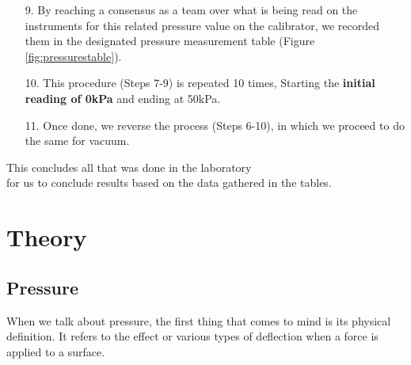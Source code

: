 \documentclass{article}
\begin{document}
	\begin{minipage}{0.51\textwidth}\vspace{-2em}\raggedright
		\begin{enumerate}[left=0in]
			\item[9.]  By reaching a consensus as a team over what is being read on the instruments for this related pressure value on the calibrator, we recorded them in the designated pressure measurement table (Figure \ref{fig:pressurestable}). 
			\item[10.] This procedure (Steps 7-9) is repeated 10 times, Starting the \textbf{initial reading of 0kPa} and ending at 50kPa. 
			\item[11.] Once done, we reverse the process (Steps 6-10), in which we proceed to do the same for vacuum.
		\end{enumerate}\noindent
		This concludes all that was done in the laboratory\\ for us to conclude results based on the data gathered in the tables.
	\end{minipage}
	
	\newpage\restoregeometry
	\section{Theory}
	
	\subsection{Pressure}
	
	When we talk about pressure, the first thing that comes to mind is its physical definition. It refers to the effect or various types of deflection when a force is applied to a surface.
	
\end{document}
